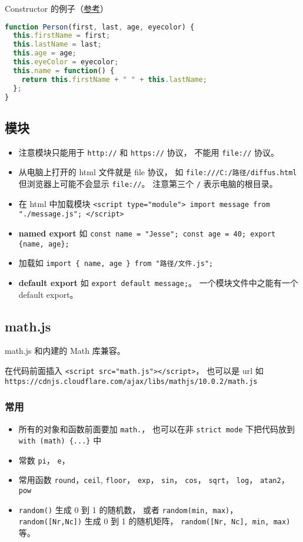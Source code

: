 Constructor 的例子（\href{https://www.w3schools.com/js/js_object_constructors.asp}{参考}）
\begin{lstlisting}[language=js]
function Person(first, last, age, eyecolor) {
  this.firstName = first;
  this.lastName = last;
  this.age = age;
  this.eyeColor = eyecolor;
  this.name = function() {
    return this.firstName + " " + this.lastName;
  };
}
\end{lstlisting}

\subsection{模块}
\begin{itemize}
\item 注意模块只能用于 \verb|http://| 和 \verb|https://| 协议， 不能用 \verb|file://| 协议。
\item 从电脑上打开的 html 文件就是 file 协议， 如 \verb|file:///C:/路径/diffus.html| 但浏览器上可能不会显示 \verb|file://|。 注意第三个 \verb|/| 表示电脑的根目录。
\item 在 html 中加载模块 \verb|<script type="module"> import message from "./message.js"; </script>|
\item \textbf{named export} 如 \verb|const name = "Jesse"; const age = 40; export {name, age};|
\item 加载如 \verb|import { name, age } from "路径/文件.js";|
\item \textbf{default export} 如 \verb|export default message;|。 一个模块文件中之能有一个 default export。
\end{itemize}


\subsection{math.js}
math.js 和内建的 Math 库兼容。

在代码前面插入 \verb|<script src="math.js"></script>|， 也可以是 url 如 \verb|https://cdnjs.cloudflare.com/ajax/libs/mathjs/10.0.2/math.js|

\subsubsection{常用}
\begin{itemize}
\item 所有的对象和函数前面要加 \verb|math.|， 也可以在非 \verb|strict mode| 下把代码放到 \verb|with (math) {...}| 中
\item 常数 \verb|pi|， \verb|e|， 
\item 常用函数 \verb|round|，\verb|ceil|, \verb|floor|， \verb|exp|， \verb|sin|， \verb|cos|， \verb|sqrt|， \verb|log|， \verb|atan2|， \verb|pow|
\item \verb|random()| 生成 0 到 1 的随机数， 或者 \verb|random(min, max)|， \verb|random([Nr,Nc])| 生成 0 到 1 的随机矩阵， \verb|random([Nr, Nc], min, max)| 等。
\end{itemize}

